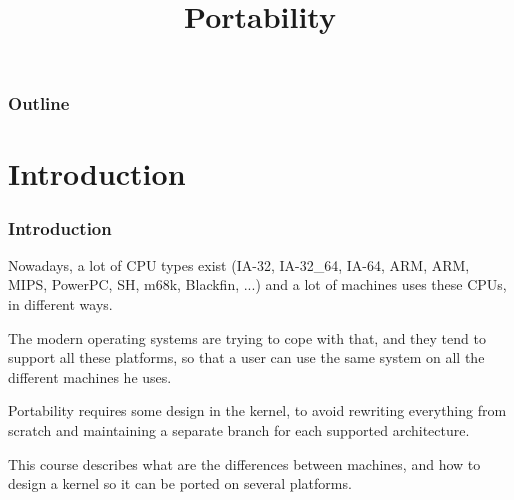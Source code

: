 %
%
%
%
%
%

%
%

%
%

\def\path{../../../..}

%
%



%
%

\title{Portability}

%
%



%
%

\begin{frame}
  \titlepage
\end{frame}

%
%

\begin{frame}
  \frametitle{Outline}

  \tableofcontents
\end{frame}

%
%

%
%

\section{Introduction}

\begin{frame}
  \frametitle{Introduction}

  Nowadays, a lot of CPU types exist (IA-32, IA-32\_64, IA-64, ARM, ARM, MIPS, PowerPC, SH, m68k, Blackfin, ...) and a lot of machines uses these CPUs, in different ways.

  \-

  The modern operating systems are trying to cope with that, and they tend to support all these platforms, so that a user can use the same system on all the different machines he uses.

  \-

  Portability requires some design in the kernel, to avoid rewriting everything from scratch and maintaining a separate branch for each supported architecture.

  \-

  This course describes what are the differences between machines, and how to design a kernel so it can be ported on several platforms.

\end{frame}

